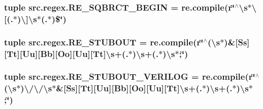 \hypertarget{namespacesrc_1_1regex_a0f26ec043d2d37bb5138bd65f4164a9f}{
\subsubsection[{R\-E\-\_\-\-S\-Q\-B\-R\-C\-T\-\_\-\-B\-E\-G\-I\-N}]{\setlength{\rightskip}{0pt plus 5cm}tuple src.\-regex.\-R\-E\-\_\-\-S\-Q\-B\-R\-C\-T\-\_\-\-B\-E\-G\-I\-N = re.\-compile(r\char`\"{}$^\wedge$\textbackslash{}s$\ast$\textbackslash{}\mbox{[}(.$\ast$)\textbackslash{}\mbox{]}\textbackslash{}s$\ast$(.$\ast$)\$\char`\"{})}}\label{namespacesrc_1_1regex_a0f26ec043d2d37bb5138bd65f4164a9f}
\hypertarget{namespacesrc_1_1regex_aca3d240c44bd8b7107e98f35b84c6cf3}{
\subsubsection[{R\-E\-\_\-\-S\-T\-U\-B\-O\-U\-T}]{\setlength{\rightskip}{0pt plus 5cm}tuple src.\-regex.\-R\-E\-\_\-\-S\-T\-U\-B\-O\-U\-T = re.\-compile(r\char`\"{}$^\wedge$(\textbackslash{}s$\ast$)\&\mbox{[}Ss\mbox{]}\mbox{[}Tt\mbox{]}\mbox{[}Uu\mbox{]}\mbox{[}Bb\mbox{]}\mbox{[}Oo\mbox{]}\mbox{[}Uu\mbox{]}\mbox{[}Tt\mbox{]}\textbackslash{}s+(.$\ast$)\textbackslash{}s+(.$\ast$)\textbackslash{}s$\ast$;\char`\"{})}}\label{namespacesrc_1_1regex_aca3d240c44bd8b7107e98f35b84c6cf3}
\hypertarget{namespacesrc_1_1regex_aaee382916094159756fb39ffdc24b2af}{
\subsubsection[{R\-E\-\_\-\-S\-T\-U\-B\-O\-U\-T\-\_\-\-V\-E\-R\-I\-L\-O\-G}]{\setlength{\rightskip}{0pt plus 5cm}tuple src.\-regex.\-R\-E\-\_\-\-S\-T\-U\-B\-O\-U\-T\-\_\-\-V\-E\-R\-I\-L\-O\-G = re.\-compile(r\char`\"{}$^\wedge$(\textbackslash{}s$\ast$)\textbackslash{}/\textbackslash{}/\textbackslash{}s$\ast$\&\mbox{[}Ss\mbox{]}\mbox{[}Tt\mbox{]}\mbox{[}Uu\mbox{]}\mbox{[}Bb\mbox{]}\mbox{[}Oo\mbox{]}\mbox{[}Uu\mbox{]}\mbox{[}Tt\mbox{]}\textbackslash{}s+(.$\ast$)\textbackslash{}s+(.$\ast$)\textbackslash{}s$\ast$;\char`\"{})}}\label{namespacesrc_1_1regex_aaee382916094159756fb39ffdc24b2af}
